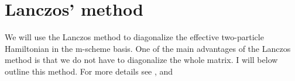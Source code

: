 %
%

\section{Lanczos' method}

We will use the Lanczos method to diagonalize the effective two-particle
Hamiltonian in the m-scheme basis. One of the main advantages of the Lanczos
method is that we do not have to diagonalize the whole matrix. I will below
outline this method. For more details see \citep{lanczo1}, and \citep{lanczo2}


